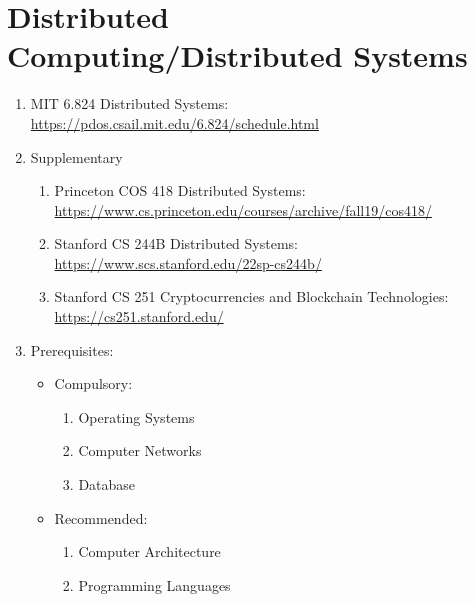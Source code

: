 \documentclass{article}
\begin{document}
\section{Distributed Computing/Distributed Systems}
\begin{enumerate}
    \item MIT 6.824 Distributed Systems:
    \href{https://pdos.csail.mit.edu/6.824/schedule.html}{https://pdos.csail.mit.edu/6.824/schedule.html}
    \item Supplementary
    \begin{enumerate}
        \item Princeton COS 418 Distributed Systems:\\
        \href{https://www.cs.princeton.edu/courses/archive/fall19/cos418/}{https://www.cs.princeton.edu/courses/archive/fall19/cos418/}
        \item Stanford CS 244B Distributed Systems:
        \href{https://www.scs.stanford.edu/22sp-cs244b/}{https://www.scs.stanford.edu/22sp-cs244b/}
        \item Stanford CS 251 Cryptocurrencies and Blockchain Technologies:\\
        \href{https://cs251.stanford.edu/}{https://cs251.stanford.edu/}
    \end{enumerate}
    
    \item Prerequisites:
    \begin{itemize}
        \item Compulsory:
        \begin{enumerate}
        \item Operating Systems
        \item Computer Networks
        \item Database        
        \end{enumerate}
        \item Recommended:
        \begin{enumerate}
        \item Computer Architecture
        \item Programming Languages
        \end{enumerate} 
    \end{itemize}
\end{enumerate}
\end{document}
